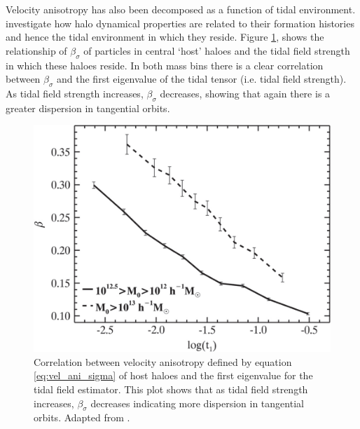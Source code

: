 Velocity anisotropy has also been decomposed as a function of tidal environment. \cite{shi2015} investigate how halo dynamical properties are related to their formation histories and hence the tidal environment in which they reside. Figure \ref{fig:shifig11}, shows the relationship of $\beta_{\sigma}$ of particles in central `host' haloes and the tidal field strength in which these haloes reside. In both mass bins there is a clear correlation between $\beta_{\sigma}$ and the first eigenvalue of the tidal tensor (i.e. tidal field strength). As tidal field strength increases, $\beta_{\sigma}$ decreases, showing that again there is a greater dispersion in tangential orbits. 
\begin{figure}
\begin{center}
	\includegraphics[width=0.5\linewidth]{thesis/latex/dyn_mod_files/shi2015fig11.jpg}
    \caption{Correlation between velocity anisotropy defined by equation \ref{eq:vel_ani_sigma} of host haloes and the first eigenvalue for the tidal field estimator. This plot shows that as tidal field strength increases, $\beta_{\sigma}$ decreases indicating more dispersion in tangential orbits. Adapted from \citet{shi2015}.}
    \label{fig:shifig11}
\end{center}
\end{figure}


